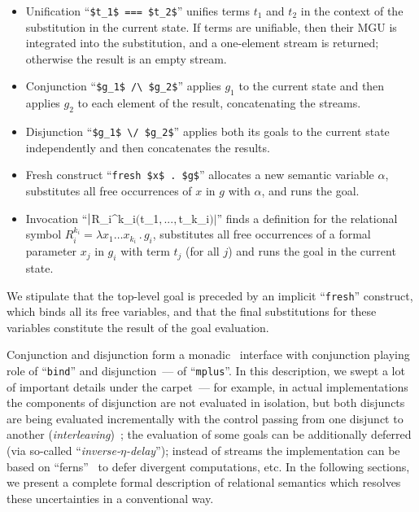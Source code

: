 \begin{itemize}
\item Unification ``\lstinline|$t_1$ === $t_2$|'' unifies terms $t_1$ and $t_2$ in the context of the substitution in the current state. If terms are unifiable,
  then their MGU is integrated into the substitution, and a one-element stream is returned; otherwise the result is an empty stream.
\item Conjunction ``\lstinline|$g_1$ /\ $g_2$|'' applies $g_1$ to the current state and then applies $g_2$ to each element of the result, concatenating
  the streams.
\item Disjunction ``\lstinline|$g_1$ \/ $g_2$|'' applies both its goals to the current state independently and then concatenates the results.
\item Fresh construct ``\lstinline|fresh $x$ . $g$|'' allocates a new semantic variable $\alpha$, substitutes all free occurrences of $x$ in $g$ with $\alpha$, and
  runs the goal.
\item Invocation ``$\lstinline|$R_i^{k_i}$ ($t_1$,...,$t_{k_i}$)|$'' finds a definition for the relational symbol \mbox{$R_i^{k_i}=\lambda x_1\dots x_{k_i}\,.\,g_i$}, substitutes
  all free occurrences of a formal parameter $x_j$ in $g_i$ with term $t_j$ (for all $j$) and runs the goal in the current state.
\end{itemize}

We stipulate that the top-level goal is preceded by an implicit ``\lstinline|fresh|'' construct, which binds all its free variables, and that the final substitutions
for these variables constitute the result of the goal evaluation.

Conjunction and disjunction form a monadic~\cite{Monads} interface with conjunction playing role of ``\lstinline|bind|'' and disjunction~--- of ``\lstinline|mplus|''.
In this description, we swept a lot of important details under the carpet~--- for example, in actual implementations the components of disjunction are not evaluated in
isolation, but both disjuncts are being evaluated incrementally with the control passing from one disjunct to another (\emph{interleaving})~\cite{Search};
the evaluation of some goals can be additionally deferred (via so-called ``\emph{inverse-$\eta$-delay}'')\cite{MicroKanren}; instead of streams
the implementation can be based on ``ferns''~\cite{BottomAvoiding} to defer divergent computations, etc. In the following sections, we present
a complete formal description of relational semantics which resolves these uncertainties in a conventional way.\\[5mm]


